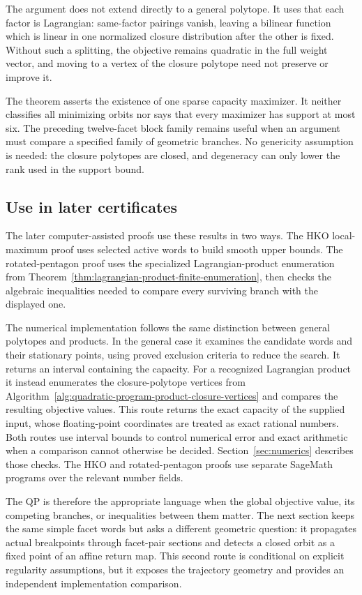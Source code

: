 \begin{remark}
The argument does not extend directly to a general polytope.  It uses that
each factor is Lagrangian: same-factor pairings vanish, leaving a bilinear
function which is linear in one normalized closure distribution after the
other is fixed.  Without such a splitting, the objective remains quadratic in
the full weight vector, and moving to a vertex of the closure polytope need not
preserve or improve it.

The theorem asserts the existence of one sparse capacity maximizer.  It neither
classifies all minimizing orbits nor says that every maximizer has support at
most six.  The preceding twelve-facet block family remains useful when an
argument must compare a specified family of geometric branches.  No
genericity assumption is needed: the closure polytopes are closed, and
degeneracy can only lower the rank used in the support bound.
\end{remark}

\subsection{Use in later certificates}
\label{subsec:quadratic-program-algorithm-hk2019-implementation-status}

The later computer-assisted proofs use these results in two ways.
The HKO local-maximum proof uses selected active words to build smooth upper
bounds. The rotated-pentagon proof uses the specialized
Lagrangian-product enumeration from
Theorem~\ref{thm:lagrangian-product-finite-enumeration}, then checks the
algebraic inequalities needed to compare every surviving branch with the
displayed one.

The numerical implementation follows the same distinction between general
polytopes and products. In the general case it examines the candidate words
and their stationary points, using proved exclusion criteria to reduce the
search. It returns an interval containing the capacity. For a recognized
Lagrangian product it instead enumerates the closure-polytope vertices from
Algorithm~\ref{alg:quadratic-program-product-closure-vertices} and compares
the resulting objective values. This route returns the exact capacity of
the supplied input, whose floating-point coordinates are treated as exact
rational numbers. Both routes use interval bounds to control numerical error
and exact arithmetic when a comparison cannot otherwise be decided.
Section~\ref{sec:numerics} describes those checks. The HKO and rotated-pentagon
proofs use separate SageMath programs over the relevant number fields.

The QP is therefore the appropriate language when the global objective value,
its competing branches, or inequalities between them matter.  The next
section keeps the same simple facet words but asks a different geometric
question: it propagates actual breakpoints through facet-pair sections and
detects a closed orbit as a fixed point of an affine return map.  This second
route is conditional on explicit regularity assumptions, but it exposes the
trajectory geometry and provides an independent implementation comparison.
